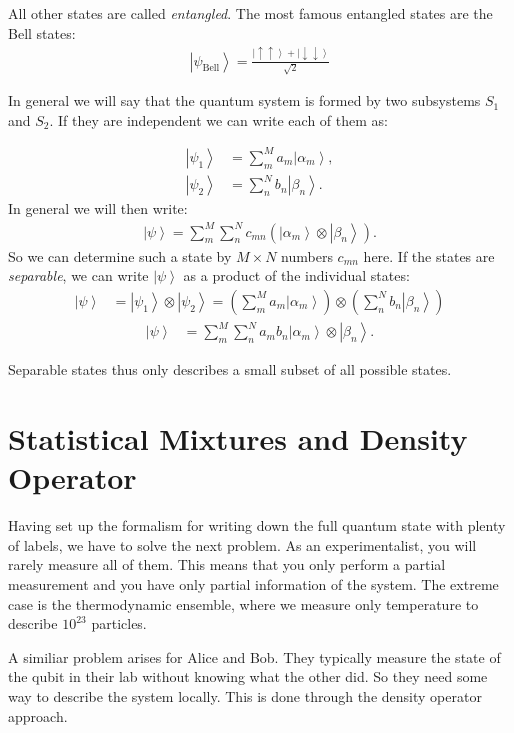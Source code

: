 \documentclass[10pt]{article}
\newcommand{\ket}[1]{\ensuremath{\left|#1\right\rangle}}
\begin{document}
All other states are called \textit{entangled}. The most famous entangled states are the Bell states:
\begin{align}
\ket{\psi_\textrm{Bell}}=\frac{\ket{\uparrow\uparrow}+\ket{\downarrow\downarrow}}{\sqrt{2}}
\end{align}

In general we will say that the quantum system is formed by two subsystems $S_1$ and $S_2$. If they are independent we can write each of them as:

\begin{align}
\ket{\psi_1}&=\sum_m^M a_m \ket{\alpha_m},\\
\ket{\psi_2}&=\sum_n^N b_n \ket{\beta_n}.

\end{align}
In general we will then write:
\begin{align}
\ket{\psi}=\sum_m^M \sum_n^N c_{mn}(\ket{\alpha_m}\otimes \ket{\beta_n}).
\end{align}
So we can determine such a state by $M \times N$ numbers $c_{mn}$ here.  If the states are \textit{separable}, we can write $\ket{\psi}$ as a product of the individual states:
\begin{align}
 \label{eq:psientangled} 
\ket{\psi}&=\ket{\psi_1}\otimes\ket{\psi_2}=\left(\sum_m^M a_m \ket{\alpha_m}\right) \otimes \left(\sum_n^N b_n \ket{\beta_n}\right)
\end{align}
\begin{align}
\ket{\psi}&=\sum_m^M \sum_n^N a_m b_n \ket{\alpha_m} \otimes \ket{\beta_n}. \label{eq:psientangled3} 
\end{align}

Separable states thus only describes a small subset of all possible states. 

\section{Statistical Mixtures and Density Operator}

Having set up the formalism for writing down the full quantum state with plenty of labels, we have to solve the next problem. As an experimentalist, you will rarely measure all of them. This means that you only perform a partial measurement and you have only partial information of the system. The extreme case is the thermodynamic ensemble, where we measure only temperature to describe $10^{23}$ particles.

A similiar problem arises for Alice and Bob. They typically measure the state of the qubit in their lab without knowing what the other did. So they need some way to describe the system locally. This is done through the density operator approach.
\end{document}
